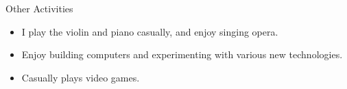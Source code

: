 \documentclass{resume} %
\begin{document}
\begin{rSection}{Other Activities} 
\begin{itemize}
    \item I play the violin and piano casually, and enjoy singing opera.
    \item Enjoy building computers and experimenting with various new technologies.
    \item Casually plays video games.
\end{itemize}


\end{rSection}

\end{document}
